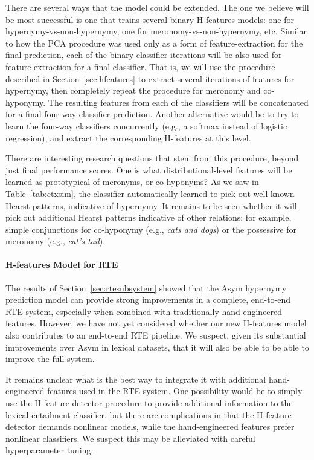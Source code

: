 \documentclass[12pt]{article}
\begin{document}
There are several ways that the model could be extended. The one we believe
will be most successful is one that trains several binary H-features models:
one for hypernymy-vs-non-hypernymy, one for meronomy-vs-non-hypernymy, etc.
Similar to how the PCA procedure was used only as a form of feature-extraction
for the final prediction, each of the binary classifier iterations will be also
used for feature extraction for a final classifier.
That is, we will use the procedure described in Section~\ref{sec:hfeatures}
to extract several iterations of features for hypernymy, then completely repeat
the procedure for meronomy and co-hyponymy. The resulting features from each
of the classifiers will be concatenated for a final four-way classifier prediction.
Another alternative would be to try to learn the four-way classifiers concurrently
(e.g., a softmax instead of logistic regression), and extract the corresponding
H-features at this level.

There are interesting research questions that stem from this procedure, beyond
just final performance scores. One is what distributional-level features will
be learned as prototypical of meronyms, or co-hyponyms? As we saw in
Table~\ref{tab:ctxsim}, the classifier automatically learned to pick
out well-known Hearst patterns, indicative of hypernymy. It remains to be seen
whether it will pick out additional Hearst patterns indicative of other
relations: for example, simple conjunctions for co-hyponymy (e.g., {\em cats
and dogs}) or the possessive for meronomy (e.g., {\em cat's tail}).

\paragraph{H-features Model for RTE}

The results of Section~\ref{sec:rtesubsystem} showed that the Asym hypernymy
prediction model can provide strong improvements in a complete, end-to-end RTE
system, especially when combined with traditionally hand-engineered features.
However, we have not yet considered whether our new H-features model also
contributes to an end-to-end RTE pipeline.
We suspect, given its substantial improvements over Asym in lexical datasets,
that it will also be able to be able to improve the full system.

It remains unclear what is the best way to integrate it with
additional hand-engineered features used in the RTE system. One possibility
would be to simply use the H-feature detector procedure to provide additional
information to the lexical entailment classifier, but there are complications
in that the H-feature detector demands nonlinear models, while the
hand-engineered features prefer nonlinear classifiers. We suspect this
may be alleviated with careful hyperparameter tuning.
\end{document}
